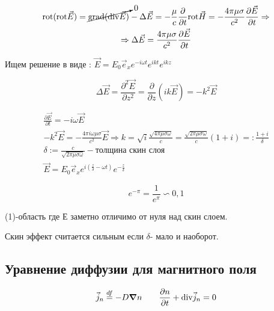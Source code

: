\begin{gather*}
    \mathrm{rot}(\mathrm{rot}\vec{E})=\cancelto{0}{\mathrm{grad}(\mathrm{div}\vec{E}) }-\Delta\vec{E} =-\frac{\mu}{c}\frac{\partial}{\partial t}\mathrm{rot}\vec{H}=-\frac{4\pi\mu\sigma}{c^2} \frac{\partial\vec{E}}{\partial t}\Rightarrow \\
    \Rightarrow \Delta\vec{E}=\frac {4\pi\mu\sigma} {c^2} \frac{\partial \vec{E}}{\partial t} 
\end{gather*}

Ищем решение в виде : \( \vec{E}=E_0\vec{e}_x e^{-i\omega t}e^{ikt} e^{ikz}   \)

\[
\Delta\vec{E}=\frac{\partial^2 \vec{E}}{\partial z^2} =\frac{\partial}{\partial z} (ik\vec{E})=-k^2 \vec{E}
\]

\begin{gather*}
    \frac{\partial\vec{E}}{\partial t}=-i\omega\vec{E} \\
    -k^2\vec{E}=-\frac{4\pi i\omega\mu\sigma}{c^2}\vec{E}\Rightarrow k=\sqrt{i} \frac{\sqrt{4\pi\mu\sigma\omega}}{c} =\frac{\sqrt{2\pi\mu\sigma\omega}}{c}(1+i)=: \frac{1+i}{\delta}  \\
    \boxed{\delta:=\frac{c}{\sqrt{2\pi\mu\sigma\omega}} }-\textit{толщина скин слоя} \\
    \vec{E}=E_0\vec{e}_x e^{i\left( \frac{z}{\delta}-\omega t \right) }e^{-\frac{z}{\delta} }  
\end{gather*}


\[
e^{-\pi}=\frac{1}{e^{\pi} }\backsim 0,1 
\]

(1)-область где Е заметно отличимо от нуля над скин слоем.

Скин эффект считается сильным если \( \delta \)- мало и наоборот.

\subsection*{Уравнение диффузии для
магнитного поля}

\[
\vec{j}_n\overset{df}{=}-D\grad n \qquad \frac{\partial n}{\partial t} +\mathrm{div}\vec{j}_n=0 
\]

